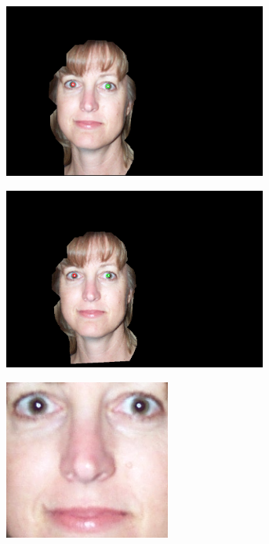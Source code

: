 \begin{figure}[H]
\centering

\begin{subfigure}{.33\textwidth}
  \centering
  \includegraphics[width=0.95\textwidth]{img/fd2/BeforeRotated.png}
  \caption{}
\end{subfigure}%
\begin{subfigure}{.33\textwidth}
  \centering
  \includegraphics[width=0.95\textwidth]{img/fd2/AfterRotated.png}
  \caption{}
\end{subfigure}%
\begin{subfigure}{.33\textwidth}
  \centering
  \includegraphics[width=0.6\textwidth]{img/fd2/output12.png}
  \caption{}
\end{subfigure}%


\end{figure}
